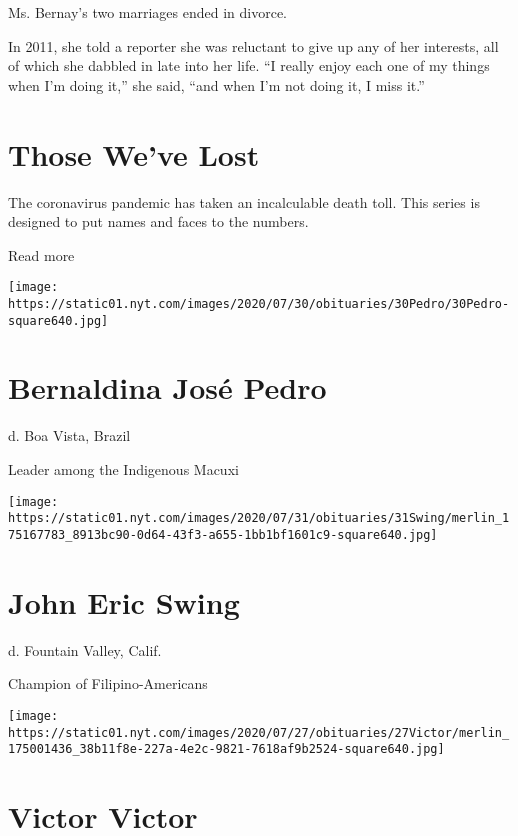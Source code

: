 Ms. Bernay's two marriages ended in divorce.

In 2011, she told a reporter she was reluctant to give up any of her
interests, all of which she dabbled in late into her life. ``I really
enjoy each one of my things when I'm doing it,'' she said, ``and when
I'm not doing it, I miss it.''

\href{https://www.nytimes.com/interactive/2020/obituaries/people-died-coronavirus-obituaries.html?action=click\&pgtype=Article\&state=default\&region=BELOW_MAIN_CONTENT\&context=covid_obits_promo}{}

\hypertarget{those-weve-lost}{%
\section{Those We've Lost}\label{those-weve-lost}}

The coronavirus pandemic has taken an incalculable death toll. This
series is designed to put names and faces to the numbers.

Read more

\texttt{[image: https://static01.nyt.com/images/2020/07/30/obituaries/30Pedro/30Pedro-square640.jpg]}

\hypertarget{bernaldina-josuxe9-pedro}{%
\section{Bernaldina José Pedro}\label{bernaldina-josuxe9-pedro}}

d. Boa Vista, Brazil

Leader among the Indigenous Macuxi

\texttt{[image: https://static01.nyt.com/images/2020/07/31/obituaries/31Swing/merlin\_175167783\_8913bc90-0d64-43f3-a655-1bb1bf1601c9-square640.jpg]}

\hypertarget{john-eric-swing}{%
\section{John Eric Swing}\label{john-eric-swing}}

d. Fountain Valley, Calif.

Champion of Filipino-Americans

\texttt{[image: https://static01.nyt.com/images/2020/07/27/obituaries/27Victor/merlin\_175001436\_38b11f8e-227a-4e2c-9821-7618af9b2524-square640.jpg]}

\hypertarget{victor-victor}{%
\section{Victor Victor}\label{victor-victor}}

